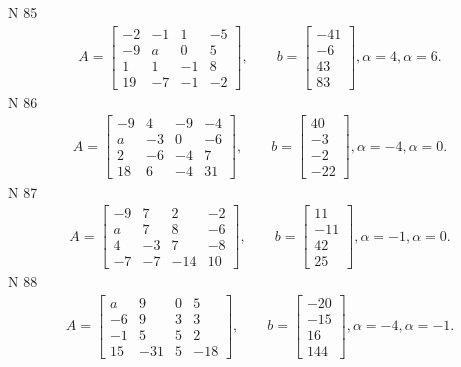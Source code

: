 \documentclass[11pt]{report}
\begin{document}
N 85
\begin{align*}
 A = \left[\begin{matrix}-2 & -1 & 1 & -5\\-9 & a & 0 & 5\\1 & 1 & -1 & 8\\19 & -7 & -1 & -2\end{matrix}\right],
    \qquad b = \left[\begin{matrix}-41\\-6\\43\\83\end{matrix}\right], \alpha = 4, \alpha = 6. 
 \end{align*}
N 86
\begin{align*}
 A = \left[\begin{matrix}-9 & 4 & -9 & -4\\a & -3 & 0 & -6\\2 & -6 & -4 & 7\\18 & 6 & -4 & 31\end{matrix}\right],
    \qquad b = \left[\begin{matrix}40\\-3\\-2\\-22\end{matrix}\right], \alpha = -4, \alpha = 0. 
 \end{align*}
N 87
\begin{align*}
 A = \left[\begin{matrix}-9 & 7 & 2 & -2\\a & 7 & 8 & -6\\4 & -3 & 7 & -8\\-7 & -7 & -14 & 10\end{matrix}\right],
    \qquad b = \left[\begin{matrix}11\\-11\\42\\25\end{matrix}\right], \alpha = -1, \alpha = 0. 
 \end{align*}
N 88
\begin{align*}
 A = \left[\begin{matrix}a & 9 & 0 & 5\\-6 & 9 & 3 & 3\\-1 & 5 & 5 & 2\\15 & -31 & 5 & -18\end{matrix}\right],
    \qquad b = \left[\begin{matrix}-20\\-15\\16\\144\end{matrix}\right], \alpha = -4, \alpha = -1. 
 \end{align*}
\end{document}
